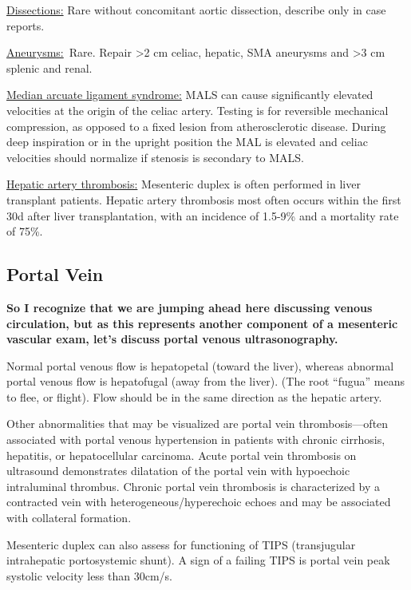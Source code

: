 \documentclass[
]{book}
\begin{document}
\uline{Dissections:} Rare without concomitant aortic dissection,
describe only in case reports.\citep{gouëffic2002, oglesby2006}

\uline{Aneurysms:}~Rare. Repair \textgreater2 cm celiac, hepatic, SMA
aneurysms and \textgreater3 cm splenic and renal.

\uline{Median arcuate ligament syndrome:} MALS can cause
significantly elevated velocities at the origin of the celiac artery.
Testing is for reversible mechanical compression, as opposed to a fixed
lesion from atherosclerotic disease. During deep inspiration or in the
upright position the MAL is elevated and celiac velocities should
normalize if stenosis is secondary to MALS.\citep{tembey2015}

\uline{Hepatic artery thrombosis:} Mesenteric duplex is often
performed in liver transplant patients. Hepatic artery thrombosis most
often occurs within the first 30d after liver transplantation, with an
incidence of 1.5-9\% and a mortality rate of 75\%.\citep{garcía-criado2009, sanyal2012}

\hypertarget{portal-vein}{%
\subsection{Portal Vein}\label{portal-vein}}

\textbf{So I recognize that we are jumping ahead here discussing venous
circulation, but as this represents another component of a mesenteric
vascular exam, let's discuss portal venous ultrasonography.}

Normal portal venous flow is hepatopetal (toward the liver), whereas
abnormal portal venous flow is hepatofugal (away from the liver). (The
root ``fugua'' means to flee, or flight). Flow should be in the same
direction as the hepatic artery.

Other abnormalities that may be visualized are portal vein
thrombosis---often associated with portal venous hypertension in
patients with chronic cirrhosis, hepatitis, or hepatocellular carcinoma.
Acute portal vein thrombosis on ultrasound demonstrates dilatation of
the portal vein with hypoechoic intraluminal thrombus. Chronic portal
vein thrombosis is characterized by a contracted vein with
heterogeneous/hyperechoic echoes and may be associated with collateral
formation.\citep{chawla2015, nouvini2013}

Mesenteric duplex can also assess for functioning of TIPS (transjugular
intrahepatic portosystemic shunt). A sign of a failing TIPS is portal
vein peak systolic velocity less than 30cm/s.
\end{document}
